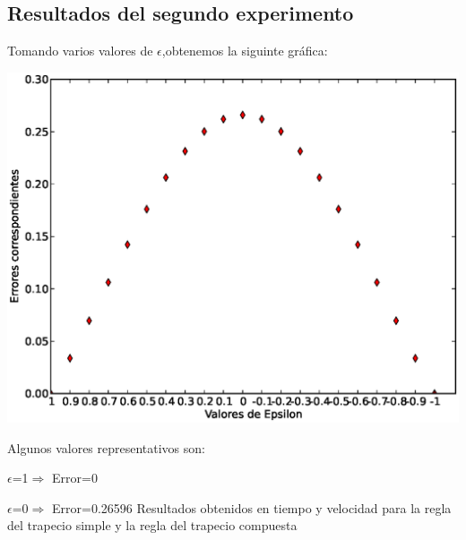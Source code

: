 \subsection{Resultados del segundo experimento}
Tomando varios valores de $\epsilon$,obtenemos la siguinte gráfica:








\includegraphics[width=1.25\textwidth]{images/imgraf}

Algunos valores representativos son:

$\epsilon$=1$\Rightarrow$ Error=0

$\epsilon$=0$\Rightarrow$ Error=0.26596
Resultados obtenidos en tiempo y velocidad para la regla del trapecio simple y la regla del trapecio compuesta


